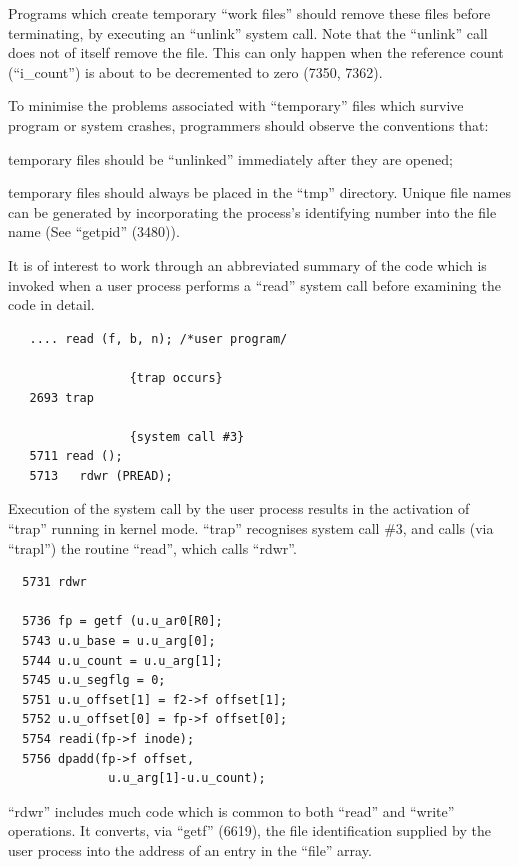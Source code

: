 Programs which create temporary ``work
files'' should remove these files before
terminating, by executing an ``unlink''
system call. Note that the ``unlink''
call does not of itself remove the
file. This can only happen when the
reference count (``i\_count'') is about to
be decremented to zero (7350, 7362).

To minimise the problems associated
with ``temporary'' files which survive
program or system crashes, programmers
should observe the conventions that:

\bd
\item[(a)] temporary files should be
 ``unlinked'' immediately after
 they are opened;

\item[(b)] temporary files should always be
 placed in the ``tmp'' directory.
 Unique file names can be generated by incorporating the
 process's identifying number into the file name (See ``getpid''
 (3480)).
\ed


It is of interest to work through an
abbreviated summary of the code which
is invoked when a user process performs
a ``read'' system call before examining
the code in detail.

\begin{verbatim}
   .... read (f, b, n); /*user program/

                 {trap occurs}
   2693 trap

                 {system call #3}
   5711 read ();
   5713   rdwr (PREAD);
\end{verbatim}



Execution of the system call by the
user process results in the activation
of ``trap'' running in kernel mode.
``trap'' recognises system call \#3, and
calls (via ``trapl'') the routine ``read'',
which calls ``rdwr''.

\begin{verbatim}
  5731 rdwr

  5736 fp = getf (u.u_ar0[R0];
  5743 u.u_base = u.u_arg[0];
  5744 u.u_count = u.u_arg[1];
  5745 u.u_segflg = 0;
  5751 u.u_offset[1] = f2->f offset[1];
  5752 u.u_offset[0] = fp->f offset[0];
  5754 readi(fp->f inode);
  5756 dpadd(fp->f offset,
              u.u_arg[1]-u.u_count);
\end{verbatim}

``rdwr'' includes much code which is common to both ``read'' and ``write'' operations. It converts, via ``getf'' (6619),
the file identification supplied by the
user process into the address of an
entry in the ``file'' array.

